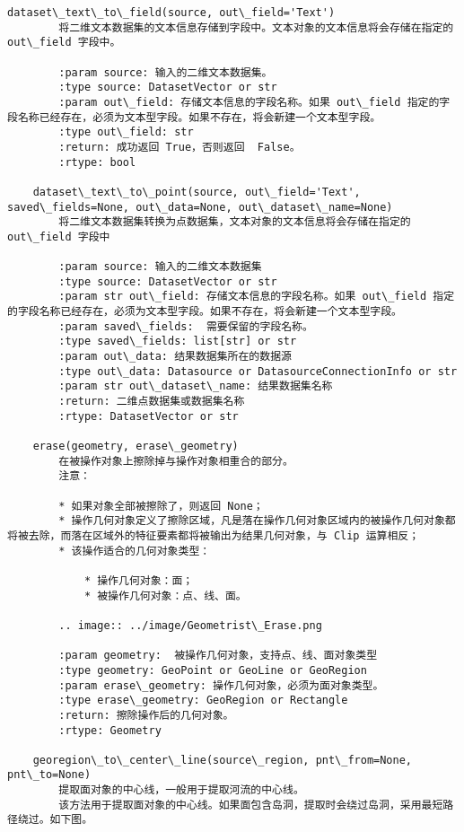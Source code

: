 \documentclass[11pt]{article}
\begin{document}
\begin{Verbatim}[commandchars=\\\{\}]
    dataset\_text\_to\_field(source, out\_field='Text')
        将二维文本数据集的文本信息存储到字段中。文本对象的文本信息将会存储在指定的 out\_field 字段中。
        
        :param source: 输入的二维文本数据集。
        :type source: DatasetVector or str
        :param out\_field: 存储文本信息的字段名称。如果 out\_field 指定的字段名称已经存在，必须为文本型字段。如果不存在，将会新建一个文本型字段。
        :type out\_field: str
        :return: 成功返回 True，否则返回  False。
        :rtype: bool
    
    dataset\_text\_to\_point(source, out\_field='Text', saved\_fields=None, out\_data=None, out\_dataset\_name=None)
        将二维文本数据集转换为点数据集，文本对象的文本信息将会存储在指定的 out\_field 字段中
        
        :param source: 输入的二维文本数据集
        :type source: DatasetVector or str
        :param str out\_field: 存储文本信息的字段名称。如果 out\_field 指定的字段名称已经存在，必须为文本型字段。如果不存在，将会新建一个文本型字段。
        :param saved\_fields:  需要保留的字段名称。
        :type saved\_fields: list[str] or str
        :param out\_data: 结果数据集所在的数据源
        :type out\_data: Datasource or DatasourceConnectionInfo or str
        :param str out\_dataset\_name: 结果数据集名称
        :return: 二维点数据集或数据集名称
        :rtype: DatasetVector or str
    
    erase(geometry, erase\_geometry)
        在被操作对象上擦除掉与操作对象相重合的部分。
        注意：
        
        * 如果对象全部被擦除了，则返回 None；
        * 操作几何对象定义了擦除区域，凡是落在操作几何对象区域内的被操作几何对象都将被去除，而落在区域外的特征要素都将被输出为结果几何对象，与 Clip 运算相反；
        * 该操作适合的几何对象类型：
        
            * 操作几何对象：面；
            * 被操作几何对象：点、线、面。
        
        .. image:: ../image/Geometrist\_Erase.png
        
        :param geometry:  被操作几何对象，支持点、线、面对象类型
        :type geometry: GeoPoint or GeoLine or GeoRegion
        :param erase\_geometry: 操作几何对象，必须为面对象类型。
        :type erase\_geometry: GeoRegion or Rectangle
        :return: 擦除操作后的几何对象。
        :rtype: Geometry
    
    georegion\_to\_center\_line(source\_region, pnt\_from=None, pnt\_to=None)
        提取面对象的中心线，一般用于提取河流的中心线。
        该方法用于提取面对象的中心线。如果面包含岛洞，提取时会绕过岛洞，采用最短路径绕过。如下图。
        

\end{Verbatim}
\end{document}
